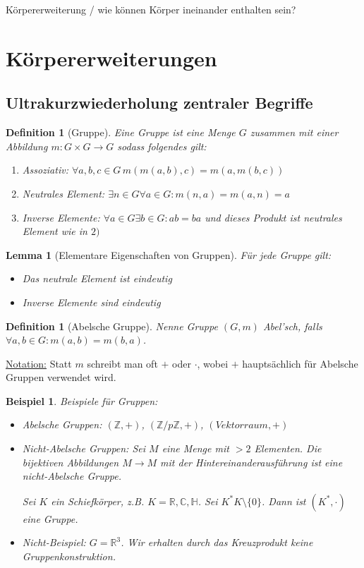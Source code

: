 \documentclass[a4paper,12pt,numbers=noenddot,parskip=full]{scrartcl}
\newcommand{\setZ}{\mathbb{Z}}
\newcommand{\setR}{\mathbb{R}}
\newcommand{\setC}{\mathbb{C}}
\newcommand{\setH}{\mathbb{H}}
\newcommand{\heading}{\underline}
\theoremstyle{dotless}
\newtheorem{lemma}[theorem]{Lemma}
\newtheorem{definition}[theorem]{Definition}
\newtheorem{example}[theorem]{Beispiel}
\theoremstyle{remark}
\begin{document}
	Körpererweiterung / wie können Körper ineinander enthalten sein?	
	
	\section{Körpererweiterungen}
	
	\subsection{Ultrakurzwiederholung zentraler Begriffe}
	
	\begin{definition}[Gruppe]
		Eine Gruppe ist eine Menge $G$ zusammen mit einer Abbildung $m: G \times G \to G$ sodass folgendes gilt:
		\begin{enumerate}
			\item Assoziativ: $\forall a,b,c \in G \, m(m(a,b), c) = m(a, m(b,c))$
			\item Neutrales Element: $\exists n \in G \forall a \in G: m(n,a) = m(a,n) = a$
			\item Inverse Elemente: $\forall a \in G \exists b \in G: ab = ba$ und dieses Produkt ist neutrales Element wie in $2)$
		\end{enumerate}
	\end{definition}

	\begin{lemma}[Elementare Eigenschaften von Gruppen]
		Für jede Gruppe gilt:
		\begin{itemize}
			\item Das neutrale Element ist eindeutig
			\item Inverse Elemente sind eindeutig
		\end{itemize}
	\end{lemma}

	\begin{definition}[Abelsche Gruppe]
		Nenne Gruppe $(G,m)$ Abel'sch, falls $\forall a,b \in G: m(a,b) = m(b,a)$.
	\end{definition}

	\heading{Notation:} Statt $m$ schreibt man oft $+$ oder $\cdot$, wobei $+$ hauptsächlich für Abelsche Gruppen verwendet wird.
	
	\begin{example}
		Beispiele für Gruppen:
		\begin{itemize}
			\item Abelsche Gruppen: $(\setZ, +)$, $(\setZ / p\setZ, +)$, $(Vektorraum, +)$
			\item Nicht-Abelsche Gruppen: Sei $M$ eine Menge mit $>2$ Elementen. Die bijektiven Abbildungen $M \to M$ mit der Hintereinanderausführung ist eine nicht-Abelsche Gruppe.
			
			Sei $K$ ein Schiefkörper, z.B. $K = \setR, \setC, \setH$. Sei $K^* K \setminus \{0\}$. Dann ist $(K^*, \cdot)$ eine Gruppe.
			\item Nicht-Beispiel: $G = \setR^3$. Wir erhalten durch das Kreuzprodukt keine Gruppenkonstruktion.
		\end{itemize}
	\end{example}
\end{document}
